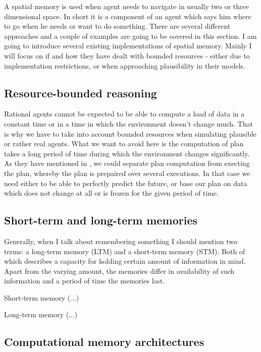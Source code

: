 A spatial memory is used when agent needs to navigate in usually two or three dimensional space. In short it is a component of an agent which says him where to go when he needs or want to do something. There are several different approaches and a couple of examples are going to be covered in this section. I am going to introduce several existing implementations of spatial memory. Mainly I will focus on if and how they have dealt with bounded resources - either due to implementation restrictions, or when approaching plausibility in their models. 

\subsection{Resource-bounded reasoning}

Rational agents cannot be expected to be able to compute a load of data in a constant time or in a time in which the environment doesn't change much. That is why we have to take into account bounded resources when simulating plausible or rather real agents. What we want to avoid here is the computation of plan takes a long period of time during which the environment changes significantly. As they have mentioned in \cite{Bratman:practicalreasoning}, we could separate plan computation from execting the plan, whereby the plan is prepaired over several executions. In that case we need either to be able to perfectly predict the future, or base our plan on data which does not change at all or is frozen for the given period of time.

\subsection{Short-term and long-term memories}

Generally, when I talk about remembering something I should mention two terms: a long-term memory (LTM) and a short-term memory (STM). Both of which describes a capacity for holding certain amount of information in mind. Apart from the varying amount, the memories differ in availability of such information and a period of time the memories last.       

Short-term memory (...)

Long-term memory (...)

\subsection{Computational memory architectures}

